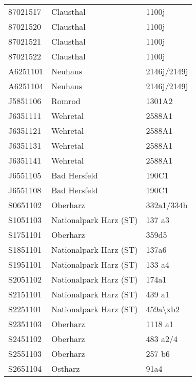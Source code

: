 \begin{singlespace}
{\begin{longtabu}{l l L}
      87021517 & Clausthal & 1100j \\
      87021520 & Clausthal & 1100j \\
      87021521 & Clausthal & 1100j \\
      87021522 & Clausthal & 1100j \\
      A6251101 & Neuhaus & 2146j/2149j \\
      A6251104 & Neuhaus & 2146j/2149j \\
      J5851106 & Romrod & 1301A2 \\
      J6351111 & Wehretal & 2588A1 \\
      J6351121 & Wehretal & 2588A1 \\
      J6351131 & Wehretal & 2588A1 \\
      J6351141 & Wehretal & 2588A1 \\
      J6551105 & Bad Hersfeld & 190C1 \\
      J6551108 & Bad Hersfeld & 190C1 \\
      S0651102 & Oberharz & 332a1/334h \\
      S1051103 & Nationalpark Harz (ST) & 137 a3 \\
      S1751101 & Oberharz & 359d5 \\
      S1851101 & Nationalpark Harz (ST) & 137a6 \\
      S1951101 & Nationalpark Harz (ST) & 133 a4 \\
      S2051102 & Nationalpark Harz (ST) & 174a1 \\
      S2151101 & Nationalpark Harz (ST) & 439 a1 \\
      S2251101 & Nationalpark Harz (ST) & 459a\textbackslash{}xb2 \\
      S2351103 & Oberharz & 1118 a1 \\
      S2451102 & Oberharz & 483 a2/4 \\
      S2551103 & Oberharz & 257 b6 \\
      S2651104 & Ostharz & 91a4 \\
    \end{longtabu}
  }
\end{singlespace}

